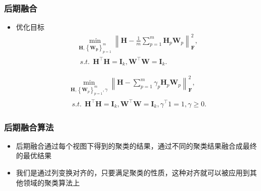\begin{frame}
    \frametitle{后期融合}
    \begin{itemize}
        \item 优化目标
 \begin{equation}
\label{MKKM LF3}
\begin{split}
\min\limits_{\mathbf{H},\left\{\mathbf{W_p}\right\}_{p=1}^m}{\left\lVert\mathbf{H} - \frac 1m \sum_{p=1}^m \mathbf{H}_p \mathbf{W}_p\right\rVert}_{\mathbf{F}}^2,\\ ~~
s.t. ~~  \mathbf{H^{\top}}\mathbf{H} = \mathbf{I}_k, \mathbf{W^{\top}}\mathbf{W} = \mathbf{I}_k.
\end{split}
\end{equation}  

\begin{equation}
\label{MKKM LF4}
\begin{split}
\min\limits_{\mathbf{H},\left\{\mathbf{W}_p\right\}_{p=1}^m,\gamma}{\left\lVert\mathbf{H} - \sum_{p=1}^m \gamma_p \mathbf{H}_p \mathbf{W}_p\right\rVert}_{\mathbf{F}}^2,\\ ~~
s.t. ~~  \mathbf{H^{\top}}\mathbf{H} = \mathbf{I}_k, \mathbf{W^{\top}}\mathbf{W} = \mathbf{I}_k,
 \gamma^{\top}1=1,\gamma \geq 0.
\end{split}
\end{equation}   
    \end{itemize}      
\end{frame}

\begin{frame}
    \frametitle{后期融合算法}
    \begin{itemize}
        \item 后期融合通过每个视图下得到的聚类的结果，通过不同的聚类结果融合成最终的最优结果
        \item 我们是通过列变换对齐的，只要满足聚类的性质，这种对齐就可以被应用到其他领域的聚类算法上
    \end{itemize}     
      
\end{frame}
